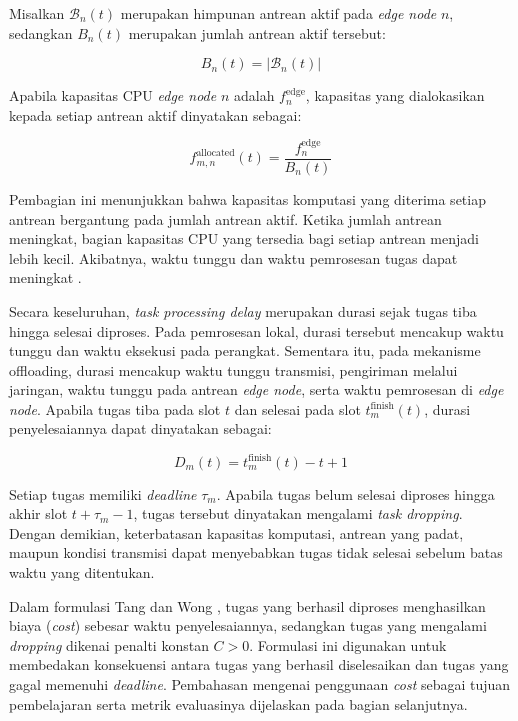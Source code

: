 Misalkan $\mathcal{B}_n(t)$ merupakan himpunan antrean aktif pada \textit{edge node} $n$, sedangkan $B_n(t)$ merupakan jumlah antrean aktif tersebut:

\begin{equation}
\label{eq:jumlah_antrean_aktif}
B_n(t)=|\mathcal{B}_n(t)|
\end{equation}

Apabila kapasitas CPU \textit{edge node} $n$ adalah $f_n^{\mathrm{edge}}$, kapasitas yang dialokasikan kepada setiap antrean aktif dinyatakan sebagai:

\begin{equation}
\label{eq:alokasi_cpu_edge}
f_{m,n}^{\mathrm{allocated}}(t)
=
\frac{f_n^{\mathrm{edge}}}{B_n(t)}
\end{equation}

Pembagian ini menunjukkan bahwa kapasitas komputasi yang diterima setiap antrean bergantung pada jumlah antrean aktif. Ketika jumlah antrean meningkat, bagian kapasitas CPU yang tersedia bagi setiap antrean menjadi lebih kecil. Akibatnya, waktu tunggu dan waktu pemrosesan tugas dapat meningkat \cite{tang2022deep}.

Secara keseluruhan, \textit{task processing delay} merupakan durasi sejak tugas tiba hingga selesai diproses. Pada pemrosesan lokal, durasi tersebut mencakup waktu tunggu dan waktu eksekusi pada perangkat. Sementara itu, pada mekanisme offloading, durasi mencakup waktu tunggu transmisi, pengiriman melalui jaringan, waktu tunggu pada antrean \textit{edge node}, serta waktu pemrosesan di \textit{edge node}. Apabila tugas tiba pada slot $t$ dan selesai pada slot $t_m^{\mathrm{finish}}(t)$, durasi penyelesaiannya dapat dinyatakan sebagai:

\begin{equation}
\label{eq:durasi_penyelesaian_tugas}
D_m(t)=t_m^{\mathrm{finish}}(t)-t+1
\end{equation}

Setiap tugas memiliki \textit{deadline} $\tau_m$. Apabila tugas belum selesai diproses hingga akhir slot $t+\tau_m-1$, tugas tersebut dinyatakan mengalami \textit{task dropping}. Dengan demikian, keterbatasan kapasitas komputasi, antrean yang padat, maupun kondisi transmisi dapat menyebabkan tugas tidak selesai sebelum batas waktu yang ditentukan.

Dalam formulasi Tang dan Wong \cite{tang2022deep}, tugas yang berhasil diproses menghasilkan biaya (\textit{cost}) sebesar waktu penyelesaiannya, sedangkan tugas yang mengalami \textit{dropping} dikenai penalti konstan $C>0$. Formulasi ini digunakan untuk membedakan konsekuensi antara tugas yang berhasil diselesaikan dan tugas yang gagal memenuhi \textit{deadline}. Pembahasan mengenai penggunaan \textit{cost} sebagai tujuan pembelajaran serta metrik evaluasinya dijelaskan pada bagian selanjutnya.


